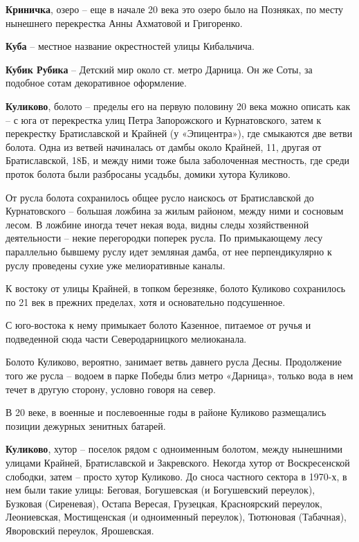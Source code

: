 \medskip


\textbf{Криничка}, озеро – еще в начале 20 века это озеро было на Позняках, по месту нынешнего перекрестка Анны Ахматовой и Григоренко.\\ 


\medskip

\textbf{Куба} – местное название окрестностей улицы Кибальчича.\\

\medskip

\textbf{Кубик Рубика} – Детский мир около ст. метро Дарница. Он же Соты, за подобное сотам декоративное оформление.\\

\medskip


\textbf{Куликово}, болото – пределы его на первую половину 20 века можно описать как – с юга от перекрестка улиц Петра Запорожского и Курнатовского, затем к перекрестку Братиславской и Крайней (у «Эпицентра»), где смыкаются две ветви болота. Одна из ветвей начиналась от дамбы около Крайней, 11, другая от Братиславской, 18Б, и между ними тоже была заболоченная местность, где среди проток болота были разбросаны усадьбы, домики хутора Куликово.

От русла болота сохранилось общее русло наискось от Братиславской до Курнатовского – большая ложбина за жилым районом, между ними и сосновым лесом. В ложбине иногда течет некая вода, видны следы хозяйственной деятельности – некие перегородки поперек русла. По примыкающему лесу параллельно бывшему руслу идет земляная дамба, от нее перпендикулярно к руслу проведены сухие уже мелиоративные каналы.

К востоку от улицы Крайней, в топком березняке, болото Куликово сохранилось по 21 век в прежних пределах, хотя и основательно подсушенное.

С юго-востока к нему примыкает болото Казенное, питаемое от ручья и подведенной сюда части Северодарницкого мелиоканала.

Болото Куликово, вероятно, занимает ветвь давнего русла Десны. Продолжение того же русла – водоем в парке Победы близ метро «Дарница», только вода в нем течет в другую сторону, условно говоря на север.

В 20 веке, в военные и послевоенные годы в районе Куликово размещались позиции дежурных зенитных батарей.\\

\medskip


\textbf{Куликово}, хутор – поселок рядом с одноименным болотом, между нынешними улицами Крайней, Братиславской и Закревского. Некогда хутор от Воскресенской слободки, затем – просто хутор Куликово. До сноса частного сектора в 1970-х, в нем были такие улицы: Беговая, Богушевская (и Богушевский переулок), Бузковая (Сиреневая), Остапа Вересая, Грузецкая, Красноярский переулок, Леониевская, Мостищенская (и одноименный переулок), Тютюновая (Табачная), Яворовский переулок, Ярошевская.

